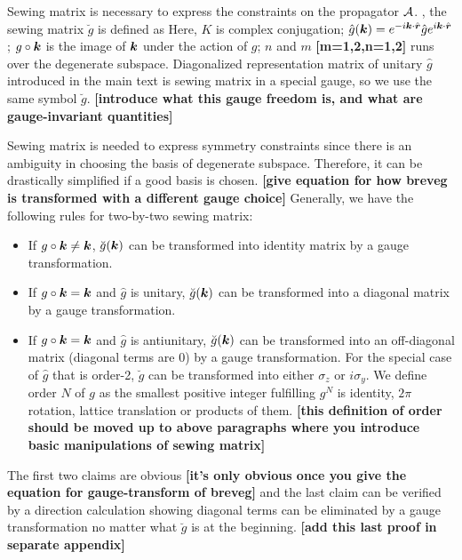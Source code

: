 \documentclass[aps, prb, showpacs, twocolumn, notitlepage, superscriptaddress]{revtex4-1}
\begin{document}
Sewing matrix is necessary to express the constraints on the propagator ${\cal A}$. , the sewing matrix $\breve{g}$ is defined as 
Here, $K$ is complex conjugation; $\hat{g}(\boldsymbol{k})=e^{-i\boldsymbol{k}\cdot\hat{\boldsymbol{r}}}\hat{g}e^{i\boldsymbol{k}\cdot\hat{\boldsymbol{r}}}$; $g\circ\boldsymbol{k}$ is the image of $\boldsymbol{k}$ under the action of $g$; $n$ and $m$ \textbf{[m=1,2,n=1,2]} runs over the degenerate subspace. Diagonalized representation matrix of unitary $\hat{g}$ introduced in the main text is sewing matrix in a special gauge, so we use the same symbol $\breve{g}$. \textbf{[introduce what this gauge freedom is, and what are gauge-invariant quantities]}

Sewing matrix is needed to express symmetry constraints since there is an ambiguity in choosing the basis of degenerate subspace. Therefore, it can be drastically simplified if a good basis is chosen. \textbf{[give equation for how breveg is transformed with a different gauge choice]} Generally, we have the following rules for two-by-two sewing matrix:
\begin{itemize}
\item If $g\circ\boldsymbol{k}\ne\boldsymbol{k}$, $\breve{g}(\boldsymbol{k})$ can be transformed into identity matrix by a gauge transformation.
\item If $g\circ\boldsymbol{k}=\boldsymbol{k}$ and $\hat{g}$ is unitary, $\breve{g}(\boldsymbol{k})$ can be transformed into a diagonal matrix by a gauge transformation.
\item If $g\circ\boldsymbol{k}=\boldsymbol{k}$ and $\hat{g}$ is antiunitary, $\breve{g}(\boldsymbol{k})$ can be transformed into an off-diagonal matrix (diagonal terms are 0) by a gauge transformation.  For the special case of $\hat{g}$ that is order-2, $\breve{g}$ can be transformed into either $\sigma_z$  or $i\sigma_y$. We define order $N$ of $g$ as the smallest positive integer fulfilling $g^N$ is identity, $2\pi$ rotation, lattice translation or products of them. \textbf{[this definition of order should be moved up to above paragraphs where you introduce basic manipulations of sewing matrix]}
\end{itemize}
The first two claims are obvious \textbf{[it's only obvious once you give the equation for gauge-transform of breveg]} and the last claim can be verified by a direction calculation showing diagonal terms can be eliminated by a gauge transformation no matter what $\breve{g}$ is at the beginning. \textbf{[add this last proof in separate appendix]}
\end{document}
